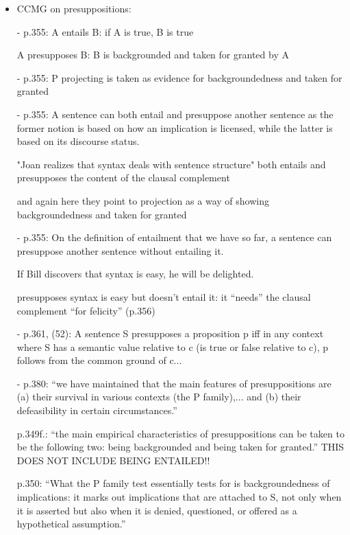 \documentclass[11pt,fleqn]{article}
\newcommand{\6}{\mbox{$[\hspace*{-.6mm}[$}}
\newcommand{\9}{\mbox{$]\hspace*{-.6mm}]$}}
\begin{document}
{\begin{itemize}
\begin{itemize}
\begin{itemize}
\item ``falsely annoyed that'': no hits

\item ``falsely annoyed NP'' HITS!


\end{itemize}

\end{itemize}


\item CCMG on presuppositions:


- p.355: A entails B: if A is true, B is true

A presupposes B: B is backgrounded and taken for granted by A

- p.355: P projecting is taken as evidence for backgroundedness and taken for granted

- p.355: A sentence can both entail and presuppose another sentence as the former notion is based on how an implication is licensed, while the latter is based on its discourse status. 

"Joan realizes that syntax deals with sentence structure" both entails and presupposes the content of the clausal complement

and again here they point to projection as a way of showing backgroundedness and taken for granted

- p.355: On the definition of entailment that we have so far, a sentence can presuppose another sentence without entailing it.

If Bill discovers that syntax is easy, he will be delighted.

presupposes syntax is easy but doesn't entail it: it ``needs'' the clausal  complement ``for felicity'' (p.356)

- p.361, (52): A sentence S presupposes a proposition p iff in any context where S has a semantic value relative to c (is true or false relative to c), p follows from the common ground of c...

- p.380: ``we have maintained that the main features of presuppositions are (a) their survival in various contexts (the P family),... and (b) their defeasibility in certain circumstances.''

p.349f.: ``the main empirical characteristics of presuppositions can be taken to be the following two: being backgrounded and being taken for granted.'' THIS DOES NOT INCLUDE BEING ENTAILED!! 

p.350: ``What the P family test essentially tests for is backgroundedness of implications: it marks out implications that are attached to S, not only when it is asserted but also when it is denied, questioned, or offered as a hypothetical assumption.''


\end{itemize}}
\end{document}
